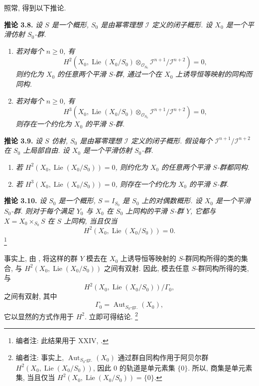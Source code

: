 照常, 得到以下推论.

\medskip
\noindent{}\textbf{推论 3.8.}
\textit{设 \(S\) 是一个概形, \(S_0\) 是由幂零理想 \(\mathscr I\)
定义的闭子概形. 设 \(X_0\) 是一个平滑仿射 \(S_0\)-群.}
\begin{enumerate}
\item[(i)] \textit{若对每个 \(n\geq0\), 有}
\[
 H^2\!\left(
  X_0,\operatorname{Lie}(X_0/S_0)
  \otimes_{\mathscr O_{S_0}}
  \mathscr I^{n+1}/\mathscr I^{n+2}
 \right)=0,
\]
\textit{则约化为 \(X_0\) 的任意两个平滑 \(S\)-群,
通过一个在 \(X_0\) 上诱导恒等映射的同构而同构.}
\item[(ii)] \textit{若对每个 \(n\geq0\), 有}
\[
 H^3\!\left(
  X_0,\operatorname{Lie}(X_0/S_0)
  \otimes_{\mathscr O_{S_0}}
  \mathscr I^{n+1}/\mathscr I^{n+2}
 \right)=0,
\]
\textit{则存在一个约化为 \(X_0\) 的平滑 \(S\)-群.}
\end{enumerate}

\medskip
\noindent{}\textbf{推论 3.9.}
\textit{设 \(S\) 仿射, \(S_0\) 是由幂零理想 \(\mathscr I\)
定义的闭子概形. 假设每个 \(\mathscr I^{n+1}/\mathscr I^{n+2}\)
在 \(S_0\) 上局部自由. 设 \(X_0\) 是一个平滑仿射 \(S_0\)-群.}
\begin{enumerate}
\item[(i)] \textit{若 \(H^2(X_0,\operatorname{Lie}(X_0/S_0))=0\),
则约化为 \(X_0\) 的任意两个平滑 \(S\)-群都同构.}
\item[(ii)] \textit{若 \(H^3(X_0,\operatorname{Lie}(X_0/S_0))=0\),
则存在一个约化为 \(X_0\) 的平滑 \(S\)-群.}
\end{enumerate}

\medskip
\noindent{}\textbf{推论 3.10.}
\textit{设 \(S_0\) 是一个概形, \(S=I_{S_0}\) 是
\(S_0\) 上的对偶数概形. 设 \(X_0\) 是一个平滑 \(S_0\)-群.
则对于每个满足 \(Y_0\) 与 \(X_0\) 在 \(S_0\) 上同构的平滑
\(S\)-群 \(Y\), 它都与 \(X=X_0\times_{S_0}S\) 在 \(S\) 上同构,
当且仅当}
\[
 H^2(X_0,\operatorname{Lie}(X_0/S_0))=0.
\]
\footnote{编者注: 此结果用于 XXIV, .}

事实上, 由 ,
将这样的群 \(Y\) 模去在 \(X_0\) 上诱导恒等映射的
\(S\)-群同构所得的类的集合,
与 \(H^2(X_0,\operatorname{Lie}(X_0/S_0))\) 之间有双射.
因此, 模去任意 \(S\)-群同构所得的类, 与
\[
 H^2(X_0,\operatorname{Lie}(X_0/S_0))/\Gamma_0,
\]
之间有双射, 其中
\[
 \Gamma_0=\operatorname{Aut}_{S_0\text{-}\mathrm{gr.}}(X_0),
\]
它以显然的方式作用于 \(H^2\). 立即可得结论.
\footnote{编者注: 事实上,
\(\operatorname{Aut}_{S_0\text{-}\mathrm{gr.}}(X_0)\)
通过群自同构作用于阿贝尔群 \(H^2(X_0,\operatorname{Lie}(X_0/S_0))\),
因此 \(0\) 的轨道是单元素集 \(\{0\}\).
所以, 商集是单元素集, 当且仅当
\(H^2(X_0,\operatorname{Lie}(X_0/S_0))=\{0\}\).}


